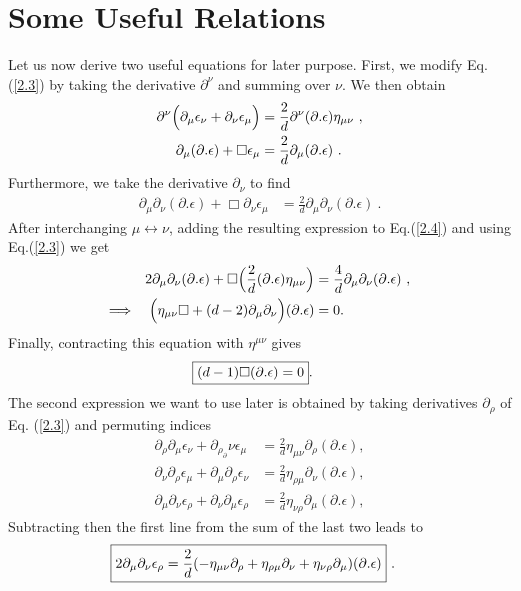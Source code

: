 \documentclass[12pt,a4paper]{report}
\begin{document}
\section{Some Useful Relations}
Let us now derive two useful equations for later purpose. First, we modify Eq. (\eqref{2.3}) by taking the derivative $\partial^\nu$ and summing over $\nu$. We then obtain \cite{Antonin, Ralph, Francesco}
\begin{align}
    \partial^\nu\Bigl(\partial_{\mu}\epsilon_{\nu}+\partial_{\nu}\epsilon_{\mu}\Bigl)&=\frac{2}{d}\partial^\nu(\partial.\epsilon)\eta_{\mu\nu}~,\nonumber\\
    \partial_\mu(\partial.\epsilon)+\Box\epsilon_\mu&=\frac{2}{d}\partial_\mu(\partial.\epsilon)~.
\end{align}
Furthermore, we take the derivative $\partial_\nu$ to find
\begin{align}
   \partial_\mu\partial_\nu(\partial.\epsilon)+\Box\partial_\nu\epsilon_\mu&=\frac{2}{d}\partial_\mu\partial_\nu(\partial.\epsilon)~. \label{2.4}
\end{align}
After interchanging $\mu\longleftrightarrow\nu$, adding the resulting expression to Eq.(\eqref{2.4}) and using Eq.(\eqref{2.3}) we get
\begin{align}
    2\partial_\mu\partial_\nu(\partial.\epsilon)+\Box\Bigl(\frac{2}{d}(\partial.\epsilon)\eta_{\mu\nu}\Bigl)&=\frac{4}{d}\partial_\mu\partial_\nu(\partial.\epsilon)~,\nonumber\\
    \Longrightarrow~~~\Bigl(\eta_{\mu\nu}\Box+(d-2)\partial_\mu\partial_\nu\Bigl)(\partial.\epsilon)&=0.
\end{align}
Finally, contracting this equation with $\eta^{\mu\nu}$ gives
\begin{align}
    \Aboxed{(d-1)\Box(\partial.\epsilon)=0}.\label{2.5}
\end{align}
The second expression we want to use later is obtained by taking derivatives $\partial_\rho$
of Eq. (\eqref{2.3}) and permuting indices
\begin{align}
    \partial_\rho\partial_\mu\epsilon_\nu+\partial_\rho_\partial\nu\epsilon_\mu&=\frac{2}{d}\eta_{\mu\nu}\partial_\rho(\partial.\epsilon),\nonumber\\
    \partial_\nu\partial_\rho\epsilon_\mu+\partial_\mu\partial_\rho\epsilon_\nu&=\frac{2}{d}\eta_{\rho\mu}\partial_\nu(\partial.\epsilon),\nonumber\\
    \partial_\mu\partial_\nu\epsilon_\rho+\partial_\nu\partial_\mu\epsilon_\rho&=\frac{2}{d}\eta_{\nu\rho}\partial_\mu(\partial.\epsilon),\nonumber
\end{align}
Subtracting then the first line from the sum of the last two leads to
\begin{align}
    \Aboxed{2\partial_\mu\partial_\nu\epsilon_\rho=\frac{2}{d}(-\eta_{\mu\nu}\partial_\rho+\eta_{\rho\mu}\partial_\nu+\eta_{\nu\rho}\partial_\mu)(\partial.\epsilon)}~.\label{2.6}
\end{align}
\end{document}
